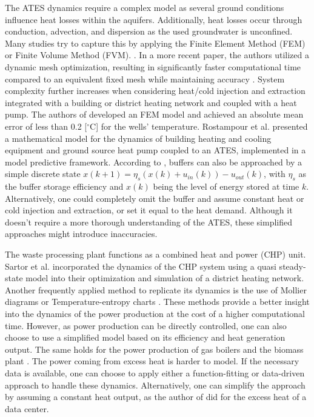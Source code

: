 The ATES dynamics require a complex model as several ground conditions influence heat losses within the aquifers. Additionally, heat losses occur through conduction, advection, and dispersion as the used groundwater is unconfined. Many studies try to capture this by applying the Finite Element Method (FEM) or Finite Volume Method (FVM). \cite{ZHOU2013240,GALGARO2013107,YAPPAROVA20141011}. In a more recent paper, the authors utilized a dynamic mesh optimization, resulting in significantly faster computational time compared to an equivalent fixed mesh while maintaining accuracy \cite{Salinas2022}. System complexity further increases when considering heat/cold injection and extraction integrated with a building or district heating network and coupled with a heat pump. The authors of \cite{BOZKAYA2017620} developed an FEM model and achieved an absolute mean error of less than 0.2 [$^{\circ}\text{C}$] for the wells' temperature. Rostampour et al. \cite{TAMASRostampour} presented a mathematical model for the dynamics of building heating and cooling equipment and ground source heat pump coupled to an ATES, implemented in a model predictive framework. According to \cite{YvoPutter}, buffers can also be approached by a simple discrete state $x(k+1) = \eta_s(x(k) + u_{in}(k)) - u_{out}(k)$, with $\eta_{s}$ as the buffer storage efficiency and $x(k)$ being the level of energy stored at time $k$.  Alternatively, one could completely omit the buffer and assume constant heat or cold injection and extraction, or set it equal to the heat demand. Although it doesn't require a more thorough understanding of the ATES, these simplified approaches might introduce inaccuracies. 

The waste processing plant functions as a combined heat and power (CHP) unit. Sartor et al. \cite{SARTOR2014474} incorporated the dynamics of the CHP system using a quasi steady-state model into their optimization and simulation of a district heating network. Another frequently applied method to replicate its dynamics is the use of Mollier diagrams or Temperature-entropy charts \cite{Laakkonen2017}. These methods provide a better insight into the dynamics of the power production at the cost of a higher computational time. However, as power production can be directly controlled, one can also choose to use a simplified model based on its efficiency and heat generation output. The same holds for the power production of gas boilers and the biomass plant \cite{Talebi,Tamasboilers}. The power coming from excess heat is harder to model. If the necessary data is available, one can choose to apply either a function-fitting or data-driven approach to handle these dynamics. Alternatively, one can simplify the approach by assuming a constant heat output, as the author of \cite{Spruit2020} did for the excess heat of a data center.

